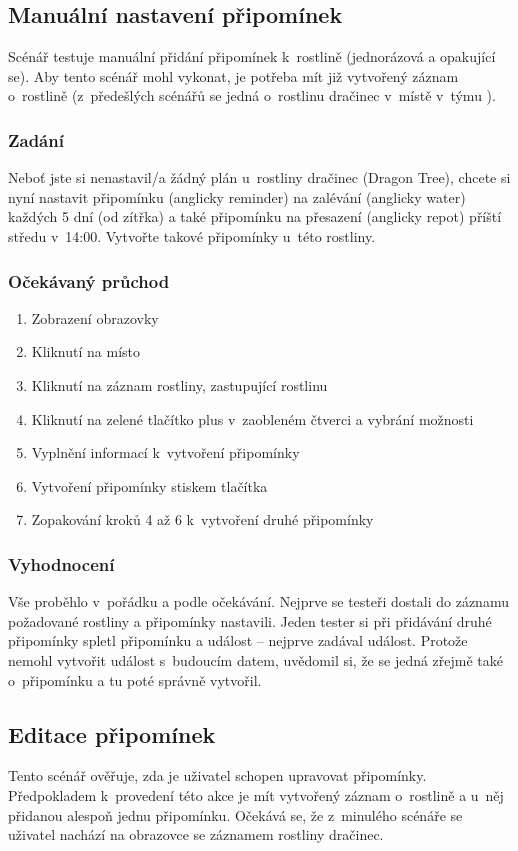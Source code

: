 \documentclass[thesis=M,czech]{FITthesis}[2019/12/23]
\begin{document}
\subsection{Manuální nastavení připomínek}
Scénář testuje manuální přidání připomínek k~rostlině (jednorázová a opakující se). Aby tento scénář mohl vykonat, je potřeba mít již vytvořený záznam o~rostlině (z~předešlých scénářů se jedná o~rostlinu dračinec v~místě  v~týmu ).
\subsubsection*{Zadání}
Neboť jste si nenastavil/a žádný plán u~rostliny dračinec (Dragon Tree), chcete si nyní nastavit připomínku (anglicky reminder) na zalévání (anglicky water) každých 5 dní (od zítřka) a také připomínku na přesazení (anglicky repot) příští středu v~14:00. Vytvořte takové připomínky u~této rostliny.
\subsubsection*{Očekávaný průchod}
\begin{enumerate}
    \item Zobrazení obrazovky 
    \item Kliknutí na místo 
    \item Kliknutí na záznam rostliny, zastupující rostlinu 
    \item Kliknutí na zelené tlačítko plus v~zaobleném čtverci a vybrání možnosti 
    \item Vyplnění informací k~vytvoření připomínky
    \item Vytvoření připomínky stiskem tlačítka 
    \item Zopakování kroků 4 až 6 k~vytvoření druhé připomínky
\end{enumerate}
\subsubsection*{Vyhodnocení}
Vše proběhlo v~pořádku a podle očekávání. Nejprve se testeři dostali do záznamu požadované rostliny a připomínky nastavili. Jeden tester si při přidávání druhé připomínky spletl připomínku a událost -- nejprve zadával událost. Protože nemohl vytvořit událost s~budoucím datem, uvědomil si, že se jedná zřejmě také o~připomínku a tu poté správně vytvořil.

\subsection{Editace připomínek}
Tento scénář ověřuje, zda je uživatel schopen upravovat připomínky. Předpokladem k~provedení této akce je mít vytvořený záznam o~rostlině a u~něj přidanou alespoň jednu připomínku. Očekává se, že z~minulého scénáře se uživatel nachází na obrazovce se záznamem rostliny dračinec.
\end{document}

